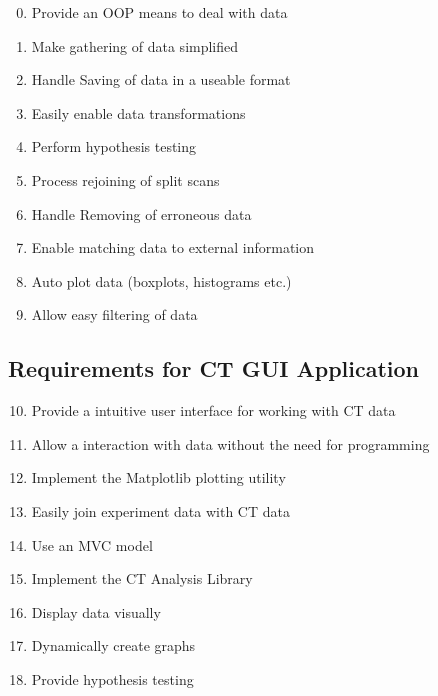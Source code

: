 \documentclass[11pt]{report}
\begin{document}
\begin{multicols}{2}

  \begin{enumerate}
  \setcounter{enumi}{-1}
  \item Provide an OOP means to deal with data
  \item Make gathering of data simplified
  \item Handle Saving of data in a useable format
  \item Easily enable data transformations
  \item Perform hypothesis testing
  \end{enumerate}

  \columnbreak

  \begin{enumerate}
  \setcounter{enumi}{4}
  \item Process rejoining of split scans
  \item Handle Removing of erroneous data
  \item Enable matching data to external information
  \item Auto plot data (boxplots, histograms etc.)
  \item Allow easy filtering of data
  \end{enumerate}

  \columnbreak

\end{multicols}

\subsection{Requirements for CT GUI Application}
\label{sec:org63057cd}

\begin{multicols}{2}

  \begin{enumerate}
  \setcounter{enumi}{9}
  \item Provide a intuitive user interface for working with CT data
  \item Allow a interaction with data without the need for programming
  \item Implement the Matplotlib plotting utility
  \item Easily join experiment data with CT data
  \item Use an MVC model
  \end{enumerate}

  \columnbreak

  \begin{enumerate}
  \setcounter{enumi}{14}
  \item Implement the CT Analysis Library
  \item Display data visually
  \item Dynamically create graphs
  \item Provide hypothesis testing
  \end{enumerate}

  \columnbreak

\end{multicols}
\end{document}
